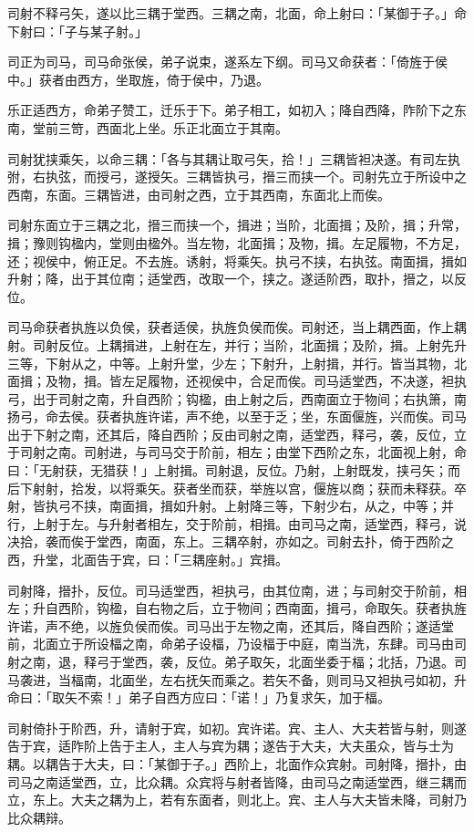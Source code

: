 \documentclass[]{article}
\begin{document}
司射不释弓矢，遂以比三耦于堂西。三耦之南，北面，命上射曰：「某御于子。」命下射曰：「子与某子射。」

司正为司马，司马命张侯，弟子说束，遂系左下纲。司马又命获者：「倚旌于侯中。」获者由西方，坐取旌，倚于侯中，乃退。

乐正适西方，命弟子赞工，迁乐于下。弟子相工，如初入；降自西降，阼阶下之东南，堂前三笴，西面北上坐。乐正北面立于其南。

司射犹挟乘矢，以命三耦：「各与其耦让取弓矢，拾！」三耦皆袒决遂。有司左执弣，右执弦，而授弓，遂授矢。三耦皆执弓，搢三而挟一个。司射先立于所设中之西南，东面。三耦皆进，由司射之西，立于其西南，东面北上而俟。

司射东面立于三耦之北，搢三而挟一个，揖进；当阶，北面揖；及阶，揖；升常，揖；豫则钩楹内，堂则由楹外。当左物，北面揖；及物，揖。左足履物，不方足，还；视侯中，俯正足。不去旌。诱射，将乘矢。执弓不挟，右执弦。南面揖，揖如升射；降，出于其位南；适堂西，改取一个，挟之。遂适阶西，取扑，搢之，以反位。

司马命获者执旌以负侯，获者适侯，执旌负侯而俟。司射还，当上耦西面，作上耦射。司射反位。上耦揖进，上射在左，并行；当阶，北面揖；及阶，揖。上射先升三等，下射从之，中等。上射升堂，少左；下射升，上射揖，并行。皆当其物，北面揖；及物，揖。皆左足履物，还视侯中，合足而俟。司马适堂西，不决遂，袒执弓，出于司射之南，升自西阶；钩楹，由上射之后，西南面立于物间；右执箫，南扬弓，命去侯。获者执旌许诺，声不绝，以至于乏；坐，东面偃旌，兴而俟。司马出于下射之南，还其后，降自西阶；反由司射之南，适堂西，释弓，袭，反位，立于司射之南。司射进，与司马交于阶前，相左；由堂下西阶之东，北面视上射，命曰：「无射获，无猎获！」上射揖。司射退，反位。乃射，上射既发，挟弓矢；而后下射射，拾发，以将乘矢。获者坐而获，举旌以宫，偃旌以商；获而未释获。卒射，皆执弓不挟，南面揖，揖如升射。上射降三等，下射少右，从之，中等；并行，上射于左。与升射者相左，交于阶前，相揖。由司马之南，适堂西，释弓，说决拾，袭而俟于堂西，南面，东上。三耦卒射，亦如之。司射去扑，倚于西阶之西，升堂，北面告于宾，曰：「三耦座射。」宾揖。

司射降，搢扑，反位。司马适堂西，袒执弓，由其位南，进；与司射交于阶前，相左；升自西阶，钩楹，自右物之后，立于物间；西南面，揖弓，命取矢。获者执旌许诺，声不绝，以旌负侯而俟。司马出于左物之南，还其后，降自西阶；遂适堂前，北面立于所设楅之南，命弟子设楅，乃设楅于中庭，南当洗，东肆。司马由司射之南，退，释弓于堂西，袭，反位。弟子取矢，北面坐委于楅；北括，乃退。司马袭进，当楅南，北面坐，左右抚矢而乘之。若矢不备，则司马又袒执弓如初，升命曰：「取矢不索！」弟子自西方应曰：「诺！」乃复求矢，加于楅。

司射倚扑于阶西，升，请射于宾，如初。宾许诺。宾、主人、大夫若皆与射，则遂告于宾，适阼阶上告于主人，主人与宾为耦；遂告于大夫，大夫虽众，皆与士为耦。以耦告于大夫，曰：「某御于子。」西阶上，北面作众宾射。司射降，搢扑，由司马之南适堂西，立，比众耦。众宾将与射者皆降，由司马之南适堂西，继三耦而立，东上。大夫之耦为上，若有东面者，则北上。宾、主人与大夫皆未降，司射乃比众耦辩。
\end{document}
